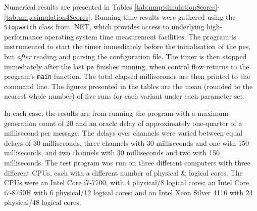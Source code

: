 Numerical results are presented in Tables \ref{tab:nmp:simulation8cores}-\ref{tab:nmp:simulation48cores}.  Running time results were gathered using the \texttt{Stopwatch} class from .NET, which provides access to underlying high-performance operating system time measurement facilities.  The program is instrumented to start the timer immediately before the initialisation of the \glspl{pe}, but \emph{after} reading and parsing the configuration file.  The timer is then stopped immediately after the last \gls{pe} finishes running, when control flow returns to the program's \texttt{main} function.  The total elapsed milliseconds are then printed to the command line.  The figures presented in the tables are the mean (rounded to the nearest whole number) of five runs for each variant under each parameter set.

In each case, the results are from running the program with a maximum generation count of 20 and an oracle delay of approximately one-quarter of a millisecond per message.  The delays over channels were varied between equal delays of 30 milliseconds, three channels with 30 milliseconds and one with 150 milliseconds, and two channels with 30 milliseconds and two with 150 milliseconds.  The test program was run on three different computers with three different CPUs, each with a different number of physical \& logical cores.  The CPUs were an Intel\textsuperscript{\textregistered} Core\textsuperscript{\texttrademark} i7-7700, with 4 physical/8 logical cores; an Intel\textsuperscript{\textregistered} Core\textsuperscript{\texttrademark} i7-8750H with 6 physical/12 logical cores; and an Intel\textsuperscript{\textregistered} Xeon\textsuperscript{\textregistered} Silver 4116 with 24 physical/48 logical cores.

